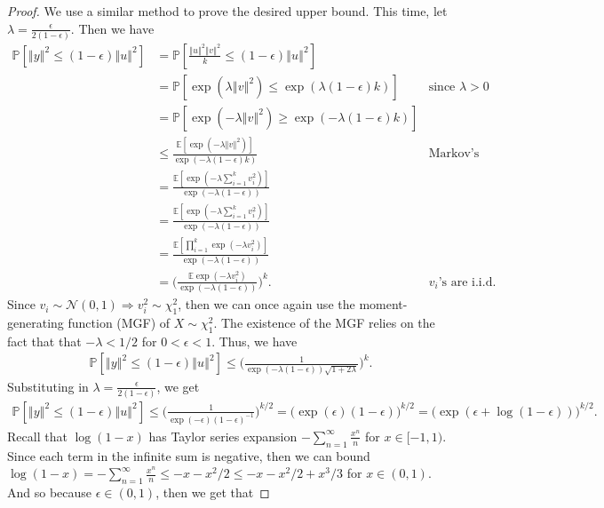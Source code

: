 \documentclass{article}
\begin{document}
\begin{proof}
We use a similar method to prove the desired upper bound. This time, let $\lambda = \frac{\epsilon}{2(1-\epsilon)}.$  Then we have 
\begin{align*}
\mathbb{P} \left[ \left\Vert y \right\Vert^2 \leq (1-\epsilon) \left\Vert u \right\Vert^2 \right] & = \mathbb{P} \left[ \frac{\left\Vert u \right\Vert^2 \left\Vert v \right\Vert^2}{k} \leq (1-\epsilon) \left\Vert u \right\Vert^2 \right]\\
& = \mathbb{P} \left[\exp(\lambda \left\Vert v \right\Vert^2) \leq \exp(\lambda (1-\epsilon) k) \right] & \text{since $\lambda > 0$}\\
& = \mathbb{P} \left[ \exp( - \lambda \left\Vert v \right\Vert^2) \geq \exp( - \lambda (1-\epsilon) k) \right] \\
& \leq \frac{\mathbb{E}[\exp( - \lambda \left\Vert v \right\Vert^2)]}{\exp( - \lambda (1-\epsilon) k)}  & \text{Markov's inequality}\\
 & = \frac{\mathbb{E}[\exp( - \lambda \sum_{i=1}^k v_i^2)]}{\exp( - \lambda (1-\epsilon) )}\\
 &= \frac{\mathbb{E}[\exp( - \lambda \sum_{i=1}^k v_i^2)]}{\exp( - \lambda (1-\epsilon) )}\\
 &= \frac{\mathbb{E} \left[\prod_{i=1}^k \exp( - \lambda v_i^2) \right]}{\exp( - \lambda (1-\epsilon) )}\\
 &= \bigg( \frac{\mathbb{E}\exp(-\lambda v_i^2)}{\exp( - \lambda (1-\epsilon) )} \bigg)^k. & \text{$v_i$'s are i.i.d.}
\end{align*}
Since $v_i \sim \mathcal{N}(0, 1) \Rightarrow v_i^2 \sim \chi_1^2$, then we can once again use the moment-generating function (MGF) of $X \sim \chi_1^2$. The existence of the MGF relies on the fact that that $-\lambda < 1/2$ for $0 < \epsilon < 1$. Thus, we have
\begin{align*}
    \mathbb{P}\left[ \left\Vert y \right\Vert^2 \leq (1-\epsilon) \left\Vert u \right\Vert^2 \right] \leq \bigg(\frac{1}{ \exp(-\lambda (1-\epsilon)) \sqrt{1+2\lambda} } \bigg)^k.
\end{align*}
Substituting in $\lambda = \frac{\epsilon}{2(1-\epsilon)}$, we get
\begin{align*}
     \mathbb{P}\left[ \left\Vert y \right\Vert^2 \leq (1-\epsilon) \left\Vert u \right\Vert^2 \right] \leq \bigg( \frac{1}{\exp(-\epsilon)(1 - \epsilon)^{-1}} \bigg)^{k/2} = \bigg( \exp(\epsilon)(1 - \epsilon) \bigg)^{k/2} = \bigg( \exp(\epsilon + \log(1 - \epsilon)) \bigg)^{k/2}.
\end{align*}
Recall that $\log(1 - x)$ has Taylor series expansion $- \sum_{n=1}^{\infty} \frac{x^n}{n}$ for $x \in [-1, 1)$. Since each term in the infinite sum is negative, then we can bound $\log(1 - x) = - \sum_{n=1}^{\infty} \frac{x^n}{n} \leq - x -x^2/2 \leq - x -x^2/2 + x^3/3$ for $x \in (0, 1)$. And so because $\epsilon \in (0,1)$, then we get that 

\end{proof}
\end{document}
